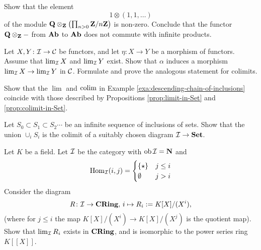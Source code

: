 
\begin{exercise}\label{exc:tensor-does-not-preserve-products}
Show that the element
\[
	1 \otimes (1, 1, \ldots )	
\]
of the module  ${\mathbf{Q}}\otimes_{\mathbf{Z}} \left( \prod_{n>0} {\mathbf{Z}}/n{\mathbf{Z}} \right)$
is non-zero. Conclude that the functor ${\mathbf{Q}}\otimes_{\mathbf{Z}} -$ from $\mathbf{Ab}$ to $\mathbf{Ab}$ does not commute with infinite products.
\end{exercise}

\begin{exercise}
Let $X,Y\colon {\mathcal{I}} \to {\mathcal{C}}$ be functors, and let $\eta\colon X \to Y$ be a morphism of functors. Assume that $\lim_{\mathcal{I}} X$ and $\lim_{\mathcal{I}} Y$ exist. Show that $\alpha$ induces a morphism $\lim_{\mathcal{I}} X \to \lim_{\mathcal{I}} Y$ in ${\mathcal{C}}$. Formulate and prove the analogous statement for colimits. 
\end{exercise}

\begin{exercise}
Show that the $\lim$ and $\operatorname{colim}$ in Example \ref{exa:descending-chain-of-inclusions} coincide with those described by
Propositions \ref{prop:limit-in-Set} and \ref{prop:colimit-in-Set}.
\end{exercise}

\begin{exercise}\label{exc:increasing-union}
Let  $S_0 \subset S_1 \subset S_2 \cdots $
be an infinite sequence of inclusions of sets. Show that the union $\cup_i S_i$ is the colimit
of a suitably chosen diagram ${\mathcal{I}} \to \mathbf{Set}$.
\end{exercise}

\begin{exercise}Let $K$ be a field. Let ${\mathcal{I}}$ be the category with $\operatorname{ob} {\mathcal{I}} = {\mathbf{N}}$ and
\[
	\operatorname{Hom}_{\mathcal{I}}(i,j) = \begin{cases} \{\star\} & j\leq i \\ \emptyset & j > i \end{cases}
\]
Consider the diagram
\[
	R\colon {\mathcal{I}} \to \mathbf{CRing},\, i \mapsto R_i := K[X]/(X^i),
\]
(where for $j\leq i$ the map $K[X]/(X^i) \to K[X]/(X^j)$ is the quotient map). Show that $\lim_{\mathcal{I}} R_i$ exists in $\mathbf{CRing}$, and is isomorphic to the power series ring $K[[X]]$.
\end{exercise}

